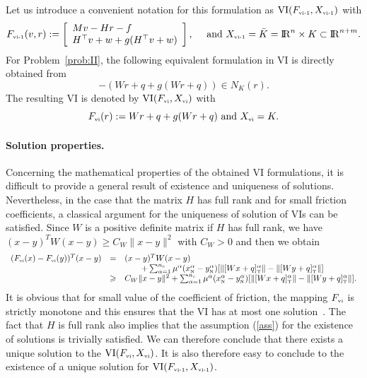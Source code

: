 Let us introduce a convenient notation for this formulation as $\mathrm{VI}(F_{{\hbox{\tiny{vi-1}}}},X_{{\hbox{\tiny{vi-1}}}})$ with
\begin{equation}
  \label{eq:vi-I}
  F_{\vione}(v,r) := \left[\begin{array}{l}
    M v-H r-f \\
    H^\top v+w  + g(H^\top v +w)
  \end{array}\right],\quad \text{ and } X_{\vione} = \bar K = \RR^n \times K\subset \RR^{n+m}.
\end{equation}
For Problem~\ref{prob:II}, the following equivalent formulation in VI is directly obtained from
\begin{equation}
  \label{eq:inclusion-1}
  -(W r + q + g(Wr+q))  \in N_K(r).
\end{equation}
 The resulting VI is denoted by $\mathrm{VI}(F_{{\hbox{\tiny{vi}}}},X_{{\hbox{\tiny{vi}}}})$ with
\begin{equation}
  \label{eq:vi-II}
  F_{\vitwo}(r) := W r +q + g(Wr+q)\text{ and } X_{\vitwo} = K.
\end{equation}

\paragraph{Solution properties.} 
Concerning the mathematical properties of the obtained VI formulations, it is difficult to provide a general result of existence and uniqueness of solutions. Nevertheless, in the case that the matrix $H$ has full rank and for small friction coefficients, a classical argument for the uniqueness of solution of VIs can be satisfied. Since $W$ is a positive definite matrix if $H$ has full rank, we have  $(x-y)^T W (x-y) \geq C_W \|x-y\|^2$ with  $C_W>0$ and then we obtain
\begin{equation}
  \label{eq:mono-II}
  \begin{array}{rcl}
    (F_{\vitwo}(x)-F_{\vitwo}(y))^T(x-y) &=& (x-y)^T W (x-y)  \\
    &  & \quad\quad + \sum _{\alpha =1}^{n_c} \mu^\alpha (x^\alpha_\n-y^\alpha_\n) [\|[Wx+q]^\alpha_\t \| - \|[Wy+q]^\alpha_\t \|] \\
    & \geq & C_W \|x-y\|^2  + \sum _{\alpha =1}^{n_c} \mu^\alpha (x^\alpha_\n-y^\alpha_\n) [\|[Wx+q]^\alpha_\t \| - \|[Wy+q]^\alpha_\t \|].
  \end{array}
\end{equation}
It is obvious that for small value of the coefficient of friction, the mapping $F_{\hbox{\tiny{vi}}}$ is strictly monotone and this ensures that the VI has at most one solution~\citep[Theorem 2.3.3]{Facchinei.Pang2003}. The fact that $H$ is full rank also implies that the assumption (\ref{ass}) for the existence of solutions is trivially satisfied. We can therefore conclude that there exists a unique solution to the $\mathrm{VI}(F_{{\hbox{\tiny{vi}}}},X_{{\hbox{\tiny{vi}}}})$. It is also therefore easy to conclude to the existence of a unique solution for  $\mathrm{VI}(F_{{\hbox{\tiny{vi-1}}}},X_{{\hbox{\tiny{vi-1}}}})$.



